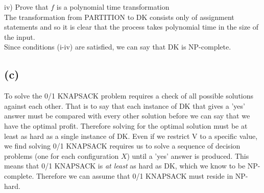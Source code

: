 			\noindent
	    iv) Prove that $f$ is a polynomial time transformation\\
			\indent The transformation from PARTITION to DK consists only of assignment statements and so it is clear \indent that the process takes polynomial time in the size of the input. \\
			
			\noindent
			Since conditions (i-iv) are satisfied, we can say that DK is NP-complete.
			
	\subsection*{(c)}
		To solve the 0/1 KNAPSACK problem requires a check of all possible solutions against each other. That is to say that each instance of DK that gives a 'yes' answer must be compared with every other solution before we can say that we have the optimal profit. Therefore solving for the optimal solution must be at least as hard as a single instance of DK. Even if we restrict V to a specific value, we find solving 0/1 KNAPSACK requires us to solve a sequence of decision problems (one for each configuration $X$) until a 'yes' answer is produced. This means that 0/1 KNAPSACK is \textit{at least} as hard as DK, which we know to be NP-complete. Therefore we can assume that 0/1 KNAPSACK  must reside in NP-hard. 